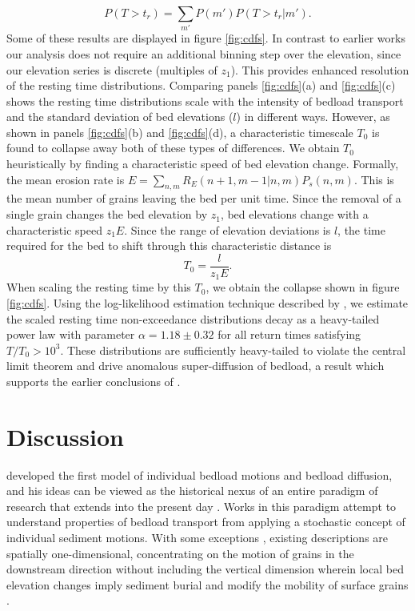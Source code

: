 \documentclass[draft]{agujournal2018}
\begin{document}
\begin{equation} P(T>t_r) = \sum_{m'} P(m') P(T>t_r|m') .\end{equation}
Some of these results are displayed in figure \ref{fig:cdfs}.
In contrast to earlier works our analysis does not require an additional binning step over the elevation, since our elevation series is discrete (multiples of $z_1$).
This provides enhanced resolution of the resting time distributions.
Comparing panels \ref{fig:cdfs}(a) and \ref{fig:cdfs}(c) shows the resting time distributions scale with the intensity of bedload transport and the standard deviation of bed elevations ($l$) in different ways.
However, as shown in panels \ref{fig:cdfs}(b) and \ref{fig:cdfs}(d), a characteristic timescale $T_0$ is found to collapse away both of these types of differences.
We obtain $T_0$ heuristically by finding a characteristic speed of bed elevation change.
Formally, the mean erosion rate is $E = \sum_{n,m}R_E(n+1,m-1|n,m)P_s(n,m)$.
This is the mean number of grains leaving the bed per unit time.
Since the removal of a single grain changes the bed elevation by $z_1$, bed elevations change with a characteristic speed $z_1 E$.
Since the range of elevation deviations is $l$, the time required for the bed to shift through this characteristic distance is
\begin{equation} T_0 = \frac{l}{z_1 E}.\label{eq:time}\end{equation}
When scaling the resting time by this $T_0$, we obtain the collapse shown in figure \ref{fig:cdfs}.
Using the log-likelihood estimation technique described by \citet{Newman2005}, we estimate the scaled resting time non-exceedance distributions decay as a heavy-tailed power law with parameter $\alpha = 1.18 \pm 0.32$ for all return times satisfying $T/T_0 > 10^3$.
These distributions are sufficiently heavy-tailed to violate the central limit theorem and drive anomalous super-diffusion of bedload, a result which supports the earlier conclusions of \citep{Martin2014}.

\section{Discussion}

\citet{Einstein1937} developed the first model of individual bedload motions and bedload diffusion, and his ideas can be viewed as the historical nexus of an entire paradigm of research that extends into the present day \citep[e.g.,][]{Hubbell1964, Nakagawa1976,Hassan1991,Ancey2008, Wu2019}.
Works in this paradigm attempt to understand properties of bedload transport from applying a stochastic concept of individual sediment motions.
With some exceptions \citep[e.g.,][]{Yang1971,Nakagawa1980,Pelosi2016,Wu2019}, existing descriptions are spatially one-dimensional, concentrating on the motion of grains in the downstream direction without including the vertical dimension wherein local bed elevation changes imply sediment burial \citep[e.g.,][]{Voepel2013,Martin2014} and modify the mobility of surface grains \citep[e.g.,][]{Yang1971,Nakagawa1980}.
\end{document}
